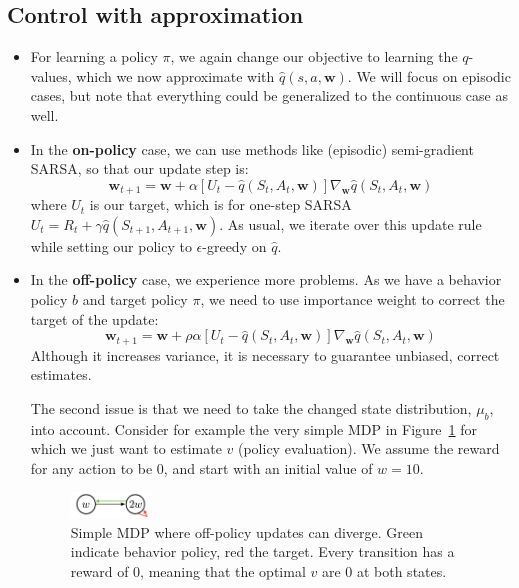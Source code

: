 \subsection{Control with approximation}
\begin{itemize}
	\item For learning a policy $\pi$, we again change our objective to learning the $q$-values, which we now approximate with $\hat{q}(s,a,\bm{w})$. We will focus on episodic cases, but note that everything could be generalized to the continuous case as well.
	\item In the \textbf{on-policy} case, we can use methods like (episodic) semi-gradient SARSA, so that our update step is:
	$$\bm{w}_{t+1}=\bm{w}+\alpha\left[U_t - \hat{q}(S_t,A_t,\bm{w})\right]\nabla_{\bm{w}}\hat{q}(S_t,A_t,\bm{w})$$
	where $U_t$ is our target, which is for one-step SARSA $U_t = R_t + \gamma \hat{q}(S_{t+1},A_{t+1},\bm{w})$.
	As usual, we iterate over this update rule while setting our policy to $\epsilon$-greedy on $\hat{q}$.
	\item In the \textbf{off-policy} case, we experience more problems. As we have a behavior policy $b$ and target policy $\pi$, we need to use importance weight to correct the target of the update:
	$$\bm{w}_{t+1}=\bm{w}+\rho \alpha\left[U_t - \hat{q}(S_t,A_t,\bm{w})\right]\nabla_{\bm{w}}\hat{q}(S_t,A_t,\bm{w})$$
	Although it increases variance, it is necessary to guarantee unbiased, correct estimates.
	
	The second issue is that we need to take the changed state distribution, $\mu_b$, into account. Consider for example the very simple MDP in Figure~\ref{fig:rl_approximation_value_based_offpolicy_divergence} for which we just want to estimate $v$ (policy evaluation). We assume the reward for any action to be $0$, and start with an initial value of $w=10$.
		
	\begin{figure}[ht!]
		\centering
		\includegraphics[width=0.2\textwidth]{figures/rl_approximation_value_based_offpolicy_divergence.png}
		\caption{Simple MDP where off-policy updates can diverge. Green indicate behavior policy, red the target. Every transition has a reward of $0$, meaning that the optimal $v$ are 0 at both states.}
		\label{fig:rl_approximation_value_based_offpolicy_divergence}
	\end{figure}
	

\end{itemize}
